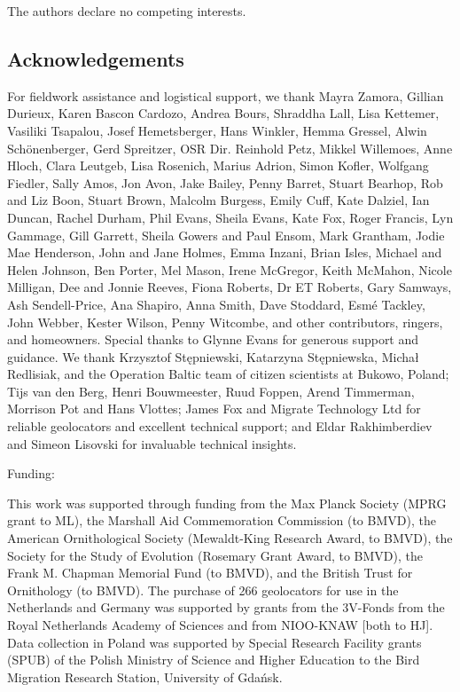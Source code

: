 \documentclass[a4paper, twoside]{templates/ociamthesis}
\begin{document}
The authors declare no competing interests.

\hypertarget{acknowledgements}{%
\subsection{Acknowledgements}\label{acknowledgements}}

For fieldwork assistance and logistical support, we thank Mayra Zamora, Gillian Durieux, Karen Bascon Cardozo, Andrea Bours, Shraddha Lall, Lisa Kettemer, Vasiliki Tsapalou, Josef Hemetsberger, Hans Winkler, Hemma Gressel, Alwin Schönenberger, Gerd Spreitzer, OSR Dir. Reinhold Petz, Mikkel Willemoes, Anne Hloch, Clara Leutgeb, Lisa Rosenich, Marius Adrion, Simon Kofler, Wolfgang Fiedler, Sally Amos, Jon Avon, Jake Bailey, Penny Barret, Stuart Bearhop, Rob and Liz Boon, Stuart Brown, Malcolm Burgess, Emily Cuff, Kate Dalziel, Ian Duncan, Rachel Durham, Phil Evans, Sheila Evans, Kate Fox, Roger Francis, Lyn Gammage, Gill Garrett, Sheila Gowers and Paul Ensom, Mark Grantham, Jodie Mae Henderson, John and Jane Holmes, Emma Inzani, Brian Isles, Michael and Helen Johnson, Ben Porter, Mel Mason, Irene McGregor, Keith McMahon, Nicole Milligan, Dee and Jonnie Reeves, Fiona Roberts, Dr ET Roberts, Gary Samways, Ash Sendell-Price, Ana Shapiro, Anna Smith, Dave Stoddard, Esmé Tackley, John Webber, Kester Wilson, Penny Witcombe, and other contributors, ringers, and homeowners. Special thanks to Glynne Evans for generous support and guidance. We thank Krzysztof Stępniewski, Katarzyna Stępniewska, Michał Redlisiak, and the Operation Baltic team of citizen scientists at Bukowo, Poland; Tijs van den Berg, Henri Bouwmeester, Ruud Foppen, Arend Timmerman, Morrison Pot and Hans Vlottes; James Fox and Migrate Technology Ltd for reliable geolocators and excellent technical support; and Eldar Rakhimberdiev and Simeon Lisovski for invaluable technical insights.

Funding:

This work was supported through funding from the Max Planck Society (MPRG grant to ML), the Marshall Aid Commemoration Commission (to BMVD), the American Ornithological Society (Mewaldt-King Research Award, to BMVD), the Society for the Study of Evolution (Rosemary Grant Award, to BMVD), the Frank M. Chapman Memorial Fund (to BMVD), and the British Trust for Ornithology (to BMVD). The purchase of 266 geolocators for use in the Netherlands and Germany was supported by grants from the 3V-Fonds from the Royal Netherlands Academy of Sciences and from NIOO-KNAW {[}both to HJ{]}. Data collection in Poland was supported by Special Research Facility grants (SPUB) of the Polish Ministry of Science and Higher Education to the Bird Migration Research Station, University of Gdańsk.
\end{document}
